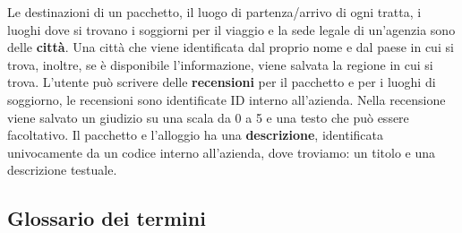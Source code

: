 %
%
Le destinazioni di un pacchetto, il luogo di partenza/arrivo di ogni tratta, i luoghi dove si trovano i soggiorni per il viaggio e la sede legale di un'agenzia sono delle \textbf{città}. Una città che viene identificata dal proprio nome e dal paese in cui si trova, inoltre, se è disponibile l'informazione, viene salvata la regione in cui si trova.
%
%
L'utente può scrivere delle \textbf{recensioni} per il pacchetto e per i luoghi di soggiorno, le recensioni sono identificate ID interno all'azienda. Nella recensione viene salvato un giudizio su una scala da 0 a 5 e una testo che può essere facoltativo.
%
%
Il pacchetto e l'alloggio ha una \textbf{descrizione}, identificata univocamente da un codice interno all'azienda, dove troviamo: un titolo e una descrizione testuale.
%

\subsection{Glossario dei termini}
